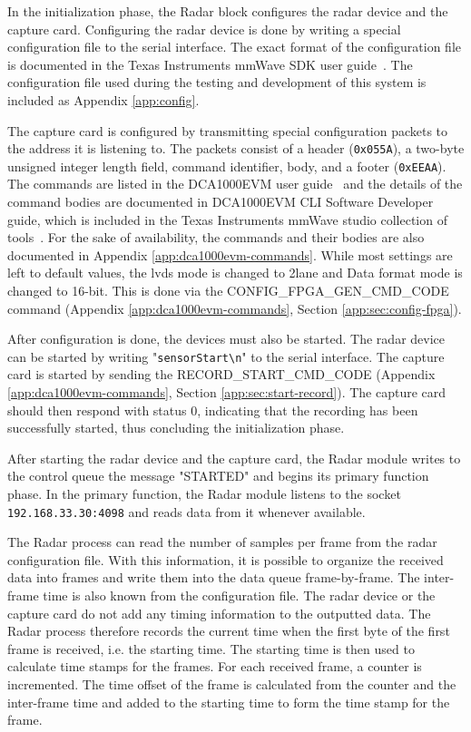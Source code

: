 In the initialization phase, the Radar block configures the radar device and the capture card.
Configuring the radar device is done by writing a special configuration file to the serial interface.
The exact format of the configuration file is documented in the Texas Instruments mmWave SDK user guide~\cite{mmwave-sdk-user-guide}.
The configuration file used during the testing and development of this system is included as Appendix \ref{app:config}.

The capture card is configured by transmitting special configuration packets to the address it is listening to.
The packets consist of a header (\texttt{0x055A}), a two-byte unsigned integer length field, command identifier, body, and a footer (\texttt{0xEEAA}).
The commands are listed in the DCA1000EVM user guide~\cite{dca1000-user-guide} and the details of the command bodies are documented in 
DCA1000EVM CLI Software Developer guide, which is included in the Texas Instruments mmWave studio collection of tools~\cite{mmwave-studio}.
For the sake of availability, the commands and their bodies are also documented in Appendix \ref{app:dca1000evm-commands}.
While most settings are left to default values, the \gls{lvds} mode is changed to 2lane and Data format mode is changed to 16-bit.
This is done via the CONFIG\_FPGA\_GEN\_CMD\_CODE command (Appendix \ref{app:dca1000evm-commands}, Section \ref{app:sec:config-fpga}).

After configuration is done, the devices must also be started.
The radar device can be started by writing "\texttt{sensorStart\textbackslash n}" to the serial interface.
The capture card is started by sending the RECORD\_START\_CMD\_CODE (Appendix \ref{app:dca1000evm-commands}, Section \ref{app:sec:start-record}).
The capture card should then respond with status 0, indicating that the recording has been successfully started,
thus concluding the initialization phase.

After starting the radar device and the capture card,
the Radar module writes to the control queue the message "STARTED" and begins its primary function phase.
In the primary function,
the Radar module listens to the socket \texttt{192.168.33.30:4098} and reads data from it whenever available.

The Radar process can read the number of samples per frame from the radar configuration file.
With this information, it is possible to organize the received data into frames and write them into the data queue frame-by-frame.
The inter-frame time is also known from the configuration file.
The radar device or the capture card do not add any timing information to the outputted data.
The Radar process therefore records the current time when the first byte of the first frame is received, i.e. the starting time.
The starting time is then used to calculate time stamps for the frames.
For each received frame, a counter is incremented. The time offset of the frame is calculated from the counter and the inter-frame time and added to the starting time
to form the time stamp for the frame.

